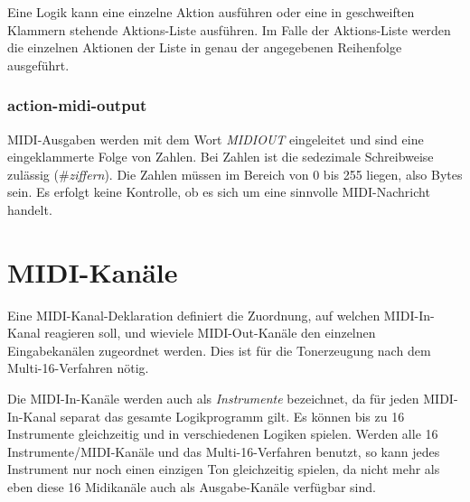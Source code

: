 Eine Logik kann eine einzelne Aktion ausführen oder eine in geschweiften
Klammern stehende Aktions-Liste aus\-füh\-ren. Im Falle der Aktions-Liste
werden die einzelnen Aktionen der Liste in genau der angegebenen
Reihenfolge ausgeführt.


\subsection{action-midi-output}\label{sec:midi-ausgaben}

MIDI-Ausgaben werden mit dem Wort \emph{MIDIOUT}
 eingeleitet und
sind eine eingeklammerte Folge von Zahlen. Bei Zahlen ist die sedezimale
Schreibweise zulässig (\#\emph{ziffern}). Die Zahlen
müssen im Bereich von 0 bis 255 liegen, also Bytes sein. Es erfolgt keine
Kontrolle, ob es sich um eine sinnvolle MIDI-Nachricht handelt.

    

\chapter{MIDI-Kanäle}\label{cha:midi-kanale}
\label{MIDIKANAL}

Eine MIDI-Kanal-Deklaration definiert die Zuordnung, auf welchen
MIDI-In-Kanal \mutabor{} reagieren soll, und wieviele MIDI-Out-Kanäle
den einzelnen Eingabekanälen zugeordnet werden. Dies ist für die
Tonerzeugung nach dem Multi-16-Verfahren
 nötig. 
\iffalse
Wird als
Synthesizer-Treiber das Modell FB-01\index{FB-01} eingestellt, so gilt nur
die Angabe des MIDI-In-Kanals, der Ausgabekanal wird ignoriert.
\fi
Die MIDI-In-Kanäle werden auch als \emph{Instrumente} bezeichnet, da
für jeden MIDI-In-Kanal separat das gesamte Logikprogramm gilt.
Es können bis zu 16 Instrumente gleichzeitig und in
verschiedenen Logiken spielen.
Werden alle 16 Instrumente/MIDI-Kanäle
und das Multi-16-Verfahren benutzt, so kann jedes Instrument nur
noch einen einzigen
Ton gleichzeitig spielen, da nicht mehr als eben diese 16 Midikanäle
auch als Ausgabe-Kanäle verfügbar sind. 
\iffalse
Beim Modell FB-01 von Yamaha wird
eine spezielle System-exklusive Ansteuerungsmethode verwendet,
so daß hier bis zu 16 Instrumente zu je 16 gleichzeitigen Tönen
spielbar sind.
\fi

